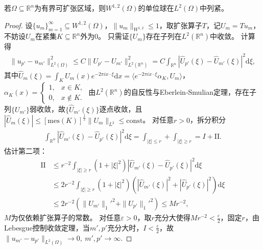 \documentclass[../../main.tex]{subfiles}%
\begin{document}
\begin{theorem}[Rellich定理]\label{theorem:Rellich定理}
若$\Omega\subseteq\mathbb{R}^{n}$为有界可扩张区域，则$W^{1,2}(\Omega)$的单位球在$L^{2}(\Omega)$中列紧。
\end{theorem}
\begin{proof}

设$\{u_{m}\}_{m=1}^{\infty}\subseteq W^{1,2}(\Omega)$，$\|u_{m}\|_{W^{1,2}}\leqslant 1$，取扩张算子$T$，记$U_{m}=Tu_{m}$，不妨设$U_{m}$在紧集$K\subseteq\mathbb{R}^{n}$外为0。
只需证$\{U_{m}\}$存在子列在$L^{2}(\mathbb{R}^{n})$中收敛。
计算得
\begin{align*}
\|u_{p'}-u_{m'}\|_{L^{2}(\Omega)}^{2}\leqslant C\|U_{p'}-U_{m'}\|_{L^{2}(\mathbb{R}^{n})}^{2}=C\int_{\mathbb{R}^{n}}|\widehat{U}_{p'}(\xi)-\widehat{U}_{m'}(\xi)|^{2}\mathrm{d}\xi,
\end{align*}
其中$\widehat{U}_{m}(\xi)=\int_{K}U_{m}(x)e^{-2\pi i x\cdot\xi}\mathrm{d}x=\langle e^{-2\pi i x\cdot\xi}\alpha_{K},U_{m}\rangle$，$\alpha_{K}(x)=\begin{cases}1,&x\in K,\\0,&x\notin K.\end{cases}$
由$L^{2}(\mathbb{R}^{n})$的自反性与Eberlein‑Smulian定理，存在子列$\{U_{m'}\}$弱收敛，故$\{\widehat{U}_{m'}(\xi)\}$逐点收敛，且$|\widehat{U}_{m}(\xi)|\leqslant[\mathrm{mes}(K)]^{\frac{1}{2}}\|U_{m}\|_{L^{2}}\leqslant\mathrm{const}$。
对任意$r>0$，拆分积分
\begin{align*}
\int_{\mathbb{R}^{n}}|\widehat{U}_{m'}(\xi)-\widehat{U}_{p'}(\xi)|^{2}\mathrm{d}\xi=\int_{|\xi|\leqslant r}+\int_{|\xi|\geqslant r}=I+\mathrm{II}.
\end{align*}
估计第二项：
\begin{align*}
\mathrm{II}&\leqslant r^{-2}\int_{|\xi|\geqslant r}(1+|\xi|^{2})|\widehat{U}_{m'}(\xi)-\widehat{U}_{p'}(\xi)|^{2}\mathrm{d}\xi\\
&\leqslant 2r^{-2}\int_{|\xi|\geqslant r}(1+|\xi|^{2})\left(|\widehat{U}_{m'}(\xi)|^{2}+|\widehat{U}_{p'}(\xi)|^{2}\right)\mathrm{d}\xi\\
&\leqslant 2r^{-2}\left(\|U_{m'}\|_{1}'^{2}+\|U_{p'}\|_{1}'^{2}\right)\leqslant Mr^{-2},
\end{align*}
$M$为仅依赖扩张算子的常数。
对任意$\varepsilon>0$，取$r$充分大使得$Mr^{-2}<\frac{\varepsilon}{2}$，固定$r$，由Lebesgue控制收敛定理，当$m',p'$充分大时，$I<\frac{\varepsilon}{2}$，故$\|u_{m'}-u_{p'}\|_{L^{2}(\Omega)}\to 0,\ m',p'\to\infty$.

\end{proof}
\end{document}
